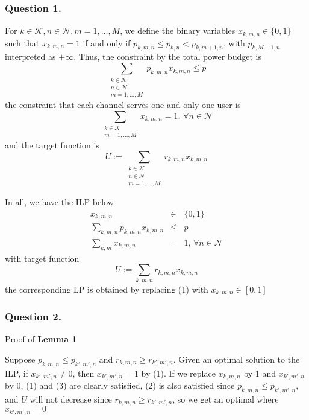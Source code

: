 \documentclass[11pt, oneside]{report}
\begin{document}
\subsubsection{Question 1.} For $k\in\mathcal{K}, n\in\mathcal{N}, m=1,\dots,M$, we define the binary variables $x_{k,m,n}\in\{0,1\}$ such that $x_{k,m,n}=1$ if and only if $p_{k,m,n}\le p_{k,n}<p_{k,m+1,n}$, with $p_{k,M+1,n}$ interpreted as $+\infty$. Thus, the constraint by the total power budget is
$$
\sum_{\substack{k\in\mathcal{K}\\n\in\mathcal{N}\\m=1,\dots,M}}p_{k,m,n}x_{k,m,n}\le p
$$
the constraint that each channel serves one and only one user is
$$
\sum_{\substack{k\in\mathcal{K}\\m=1,\dots,M}}x_{k,m,n}=1, \, \forall n\in\mathcal{N}
$$
and the target function is
$$
U:=\sum_{\substack{k\in\mathcal{K}\\n\in\mathcal{N}\\m=1,\dots,M}}r_{k,m,n}x_{k,m,n}
$$

In all, we have the ILP below
\begin{eqnarray}
x_{k,m,n}&\in&\{0,1\} \\
\sum_{k,m,n}p_{k,m,n}x_{k,m,n}&\le& p \\
\sum_{k,m}x_{k,m,n}&=&1, \, \forall n\in\mathcal{N}
\end{eqnarray}
with target function
$$
U:=\sum_{k,m,n}r_{k,m,n}x_{k,m,n}
$$
the corresponding LP is obtained by replacing (1) with $x_{k,m,n}\in[0,1]$

\subsubsection{Question 2.} Proof of \textbf{Lemma 1}

Suppose $p_{k,m,n}\le p_{k',m',n}$ and $r_{k,m,n}\ge r_{k',m',n}$. Given an optimal solution to the ILP, if $x_{k',m',n}\ne0$, then $x_{k',m',n}=1$ by (1). If we replace $x_{k,m,n}$ by 1 and $x_{k',m',n}$ by 0, (1) and (3) are clearly satisfied, (2) is also satisfied since $p_{k,m,n}\le p_{k',m',n}$, and $U$ will not decrease since $r_{k,m,n}\ge r_{k',m',n}$, so we get an optimal where $x_{k',m',n}=0$

\hspace{1em}
\end{document}
